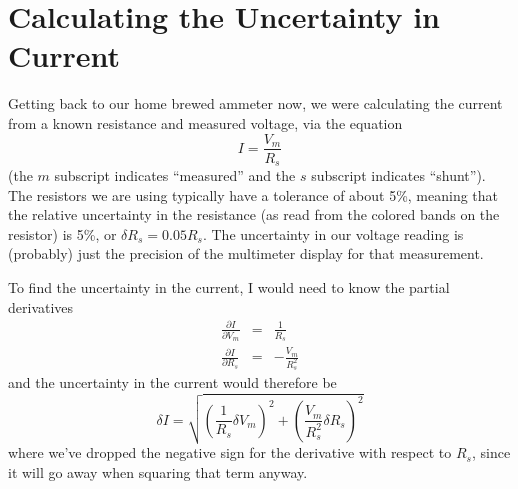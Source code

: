 

\section{Calculating the Uncertainty in Current}

Getting back to our home brewed ammeter now, we were calculating the current
from a known resistance and measured voltage, via the equation
\begin{equation*}
I=\frac{V_{m}}{R_{s}}
\end{equation*}
(the $m$ subscript indicates ``measured'' and the $s$ subscript indicates
``shunt'').
The resistors we are using typically have a tolerance of about 5\%, meaning 
that the relative uncertainty in the resistance (as read from the colored 
bands on the resistor) is 5\%, or $\delta R_{s}=0.05 R_{s}$. The uncertainty
in our voltage reading is (probably) just the precision of the multimeter
display for that measurement.

To find the uncertainty in the current, I would need to know the partial 
derivatives
\begin{eqnarray*}
    \frac{\partial I}{\partial V_m}&=&\frac{1}{R_s}\\
    \frac{\partial I}{\partial R_s}&=&-\frac{V_m}{R_s^2}
\end{eqnarray*}
and the uncertainty in the current would therefore be
\begin{equation}
    \delta I=\sqrt{
        \left(\frac{1}{R_s}\delta V_m\right)^2+
        \left(\frac{V_m}{R_s^2}\delta R_s\right)^2}
\end{equation}
where we've dropped the negative sign for the derivative with respect to $R_s$, 
since it will go away when squaring that term anyway.


